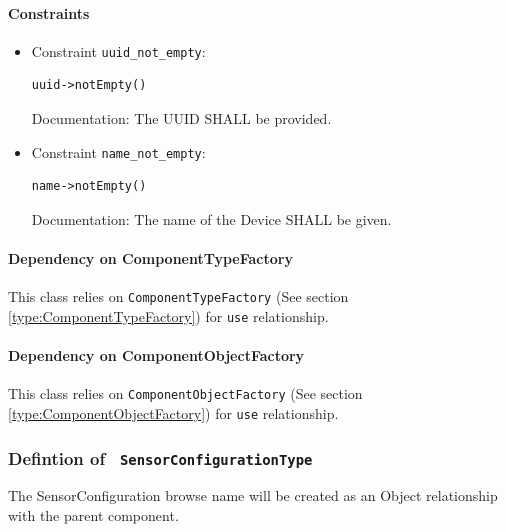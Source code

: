 \paragraph{Constraints}
\begin{itemize}
\item Constraint \texttt{uuid_not_empty}: 
   \indent \begin{Verbatim}[xleftmargin=.25in,fontsize=\small]
uuid->notEmpty()
\end{Verbatim}
Documentation: The  UUID SHALL be provided.

\end{itemize}
\begin{itemize}
\item Constraint \texttt{name_not_empty}: 
   \indent \begin{Verbatim}[xleftmargin=.25in,fontsize=\small]
name->notEmpty()
\end{Verbatim}
Documentation: The name of the Device SHALL be given.

\end{itemize}
\paragraph{Dependency on ComponentTypeFactory}

This class relies on \texttt{ComponentTypeFactory} (See section \ref{type:ComponentTypeFactory}) for \texttt{use} relationship.

\paragraph{Dependency on ComponentObjectFactory}

This class relies on \texttt{ComponentObjectFactory} (See section \ref{type:ComponentObjectFactory}) for \texttt{use} relationship.

\FloatBarrier
\subsubsection{Defintion of \texttt{ SensorConfigurationType}} \label{type:SensorConfigurationType}

\FloatBarrier

The SensorConfiguration browse name will be created as an Object relationship with the parent component.

